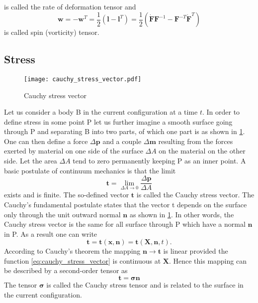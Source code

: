 is called the rate of deformation tensor and 
\begin{equation}
    \nonumber\mathbf{w} 
    = -\mathbf{w}^{T}
    = \dfrac{1}{2}\left(\mathbf{l}-\mathbf{l}^{T}\right)
    = \dfrac{1}{2}\left(\dot{\mathbf{F}}\mathbf{F}^{-1} -\mathbf{F}^{-T}\dot{\mathbf{F}}^{T}\right)
    \label{vorticity}
\end{equation}
is called spin (vorticity) tensor.

\subsection{Stress}
\begin{figure}[htpb]
    \centering
    \texttt{[image: cauchy\_stress\_vector.pdf]}
    \caption{Cauchy stress vector}%
    \label{fig:cauchy_stress_vector}
\end{figure}
Let us consider a body B in the current configuration at a time \(t\). In order to define stress in some point P let us further imagine a smooth surface going through P and separating B into two parts, of which one part is as shown in \cref{fig:cauchy_stress_vector}. One can then define a force \(\Delta\bm{p}\) and a couple \(\Delta\bm{m}\) resulting from the forces exerted by material on one side of the surface \(\Delta A\) on the material on the other side. Let the area \(\Delta A\) tend to zero permanently keeping P as an inner point. A basic postulate of continuum mechanics is that the limit 
\begin{equation}
    \bm{t} = \lim_{\Delta A \to 0}\frac{\Delta\bm{p}}{\Delta A}
\end{equation}
exists and is finite. The so-defined vector \(\bm{t}\) is called the Cauchy stress vector. The Cauchy's fundamental postulate states that the vector t depends on the surface only through the unit outward normal \(\bm{n}\) as shown in \cref{fig:cauchy_stress_vector}. In other words, the Cauchy stress vector is the same for all surface through P which have a normal \(\bm{n}\) in P. As a result one can write
\begin{equation}
    \bm{t} = \bm{t}(\bm{x},\bm{n}) = \bm{t}(\bm{X},\bm{n},t).
    \label{eq:cauchy_stress_vector}
\end{equation}
According to Cauchy's theorem the mapping \(\bm{n}\rightarrow \bm{t}\) is linear provided the function \cref{eq:cauchy_stress_vector} is continuous at \(\bm{X}\). Hence this mapping can be described by a second-order tensor as 
\begin{equation}
    \bm{t} = \bm{\sigma}\bm{n}
    \label{eq:cauchy_stress_tensor}
\end{equation}
The tensor \(\bm{\sigma}\) is called the Cauchy stress tensor and is related to the surface in the current configuration. 

